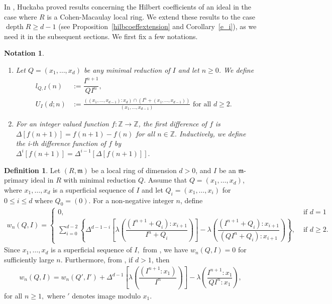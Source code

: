\documentclass[reqno,a4paper,dvipsnames]{amsart}
\newcommand{\m}{\mathfrak{m} }
\newcommand{\depth}{\operatorname{depth}}
\newtheorem{notation}[theorem]{Notation}
\theoremstyle{definition}
\newtheorem{definition}[theorem]{Definition}
\begin{document}
 In \cite[Theorem 2.4 and Corollary 2.10]{sam}, Huckaba proved  results concerning the Hilbert coefficients of an ideal  in the case where $R$ is a Cohen-Macaulay local ring. We extend these results to the case $\depth R \geq d-1$
(see Proposition~\ref{hilbcoeffextension} and Corollary~\ref{e_i}),   as we need it in the subsequent sections.    We first fix a few notations.
 

\begin{notation} \normalfont
\begin{enumerate} [\normalfont(i)]
    \item  Let  $Q = (x_1, \ldots, x_d) $ be any minimal reduction of $I$ and let $n \geq 0$.
We define 
\begin{align*}
  l_{Q,I}(n) & :=\dfrac{I^{n+1}}{QI^{n}},&\\
  U_{I}(d;n) & := \frac{((x_{1}, \ldots, x_{d-1}):x_{d})\cap (I^{n}+(x_{1}, \ldots, x_{d-1}))}{(x_1, \ldots, x_{d-1})} \text { for all } d\geq 2.
\end{align*}

\item For an integer valued function $f:\mathbb Z \longrightarrow \mathbb Z$, the \textit{first difference} of $f$ is  $\Delta[f(n+1)]=f(n+1)-f(n)$ for all $n \in \mathbb Z.$ Inductively, we define the \textit{i-th difference function} of $f$ by $\Delta^{i}[f(n+1)]=\Delta^{i-1}[\Delta[f(n+1)]].$
\end{enumerate}
   \end{notation}

\begin{definition} \cite[Definition 2.1]{sam}
    Let $(R, \m)$ be a local ring of dimension $d >0$, and $I$ be an $\m$-primary ideal in $R$ with minimal reduction $Q$. Assume that  $Q=(x_{1}, \ldots, x_{d})$, where $x_{1},\ldots,x_{d}$ is a superficial sequence of $I$ and let $Q_{i}=(x_{1},\ldots,x_{i})$ for $0 \leq i \leq d$ where $Q_{0}=(0).$ For a non-negative integer $n$, define 
        \begin{align*}
        w_{n}(Q,I)
        = \begin{cases}
        0, & \mbox{ if } d=1 \\
     \displaystyle   \sum_{i=0}^{d-2} \left\{ \Delta^{d-1-i} \left[ \lambda\left( \dfrac{ (I^{n+1} + Q_i):x_{i+1}}{I^{n}+Q_i}\right)\right]
               -\lambda\left( \dfrac{(I^{n+1}+Q_{i}):x_{i+1}}{(QI^{n}+Q_{i}):x_{i+1}}\right) \right\}, & \mbox{ if } d \geq 2.
        \end{cases}
    \end{align*}
    Since $x_{1},\ldots,x_{d}$ is a superficial sequence of $I,$ from  \cite[Remark 2.2]{sam}, we have $w_{n}(Q,I)=0$ for sufficiently large $n.$ Furthermore, from \cite[Lemma 2.3]{sam}, if $d >1$, then 
        \begin{eqnarray}\label{wequation}
            w_{n}(Q,I)=w_{n}(Q',I')+\Delta^{d-1}\left[\lambda\left( \dfrac{(I^{n+1}:x_{1})}{I^{n}}\right)\right]-\lambda\left( \dfrac{I^{n+1}:x_{1}}{QI^{n}:x_{1}}\right),
         \end{eqnarray}
        for all $n \geq 1,$ where $'$ denotes image modulo $x_{1}.$
\end{definition}
\end{document}
